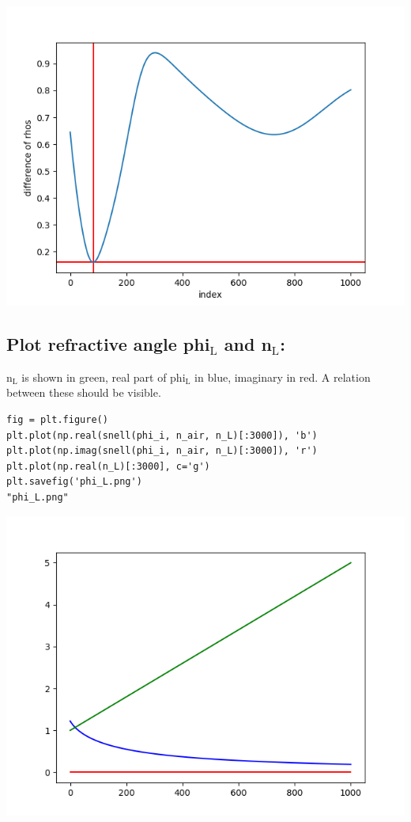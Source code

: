 \documentclass[11pt]{article}
\begin{document}
\begin{center}
\includegraphics[width=.9\linewidth]{./diff.png}
\end{center}

\subsection{Plot refractive angle phi\(_{\text{L}}\) and n\(_{\text{L}}\):}
\label{sec:org0fab06d}

n\(_{\text{L}}\) is shown in green, real part of phi\(_{\text{L}}\) in blue, imaginary in red. 
A relation between these should be visible.

\begin{verbatim}
fig = plt.figure()
plt.plot(np.real(snell(phi_i, n_air, n_L)[:3000]), 'b')
plt.plot(np.imag(snell(phi_i, n_air, n_L)[:3000]), 'r')
plt.plot(np.real(n_L)[:3000], c='g')
plt.savefig('phi_L.png')
"phi_L.png"
\end{verbatim}

\begin{center}
\includegraphics[width=.9\linewidth]{phi_L.png}
\end{center}
\end{document}
